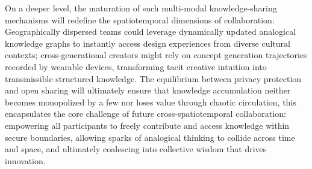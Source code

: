 On a deeper level, the maturation of such multi-modal knowledge-sharing mechanisms will redefine the spatiotemporal dimensions of collaboration: Geographically dispersed teams could leverage dynamically updated analogical knowledge graphs to instantly access design experiences from diverse cultural contexts; cross-generational creators might rely on concept generation trajectories recorded by wearable devices, transforming tacit creative intuition into transmissible structured knowledge. The equilibrium between privacy protection and open sharing will ultimately ensure that knowledge accumulation neither becomes monopolized by a few nor loses value through chaotic circulation, this encapsulates the core challenge of future cross-spatiotemporal collaboration: empowering all participants to freely contribute and access knowledge within secure boundaries, allowing sparks of analogical thinking to collide across time and space, and ultimately coalescing into collective wisdom that drives innovation.


